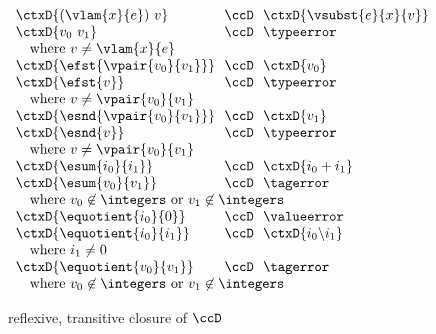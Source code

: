 \begin{flushleft}
\begin{minipage}[t]{\columnwidth}
\begin{mathpar}
\end{mathpar}
\end{minipage}

\begin{minipage}[b]{\columnwidth}
\\
$\begin{array}{l@{~~}c@{~~}l}
  \ctxD{(\vlam{x}{e})~v} & \ccD & \ctxD{\vsubst{e}{x}{v}}
\\
  \ctxD{v_0~v_1} & \ccD & \typeerror
\\ \multicolumn{3}{l}{\mbox{\quad where $v \neq \vlam{x}{e}$}}
\\
  \ctxD{\efst{\vpair{v_0}{v_1}}} & \ccD & \ctxD{v_0}
\\
  \ctxD{\efst{v}} & \ccD & \typeerror
\\ \multicolumn{3}{l}{\mbox{\quad where $v \neq \vpair{v_0}{v_1}$}}
\\
  \ctxD{\esnd{\vpair{v_0}{v_1}}} & \ccD & \ctxD{v_1}
\\
  \ctxD{\esnd{v}} & \ccD & \typeerror
\\ \multicolumn{3}{l}{\mbox{\quad where $v \neq \vpair{v_0}{v_1}$}}
\\
  \ctxD{\esum{i_0}{i_1}} & \ccD & \ctxD{i_0 + i_1}
\\
  \ctxD{\esum{v_0}{v_1}} & \ccD & \tagerror
\\ \multicolumn{3}{l}{\mbox{\quad where $v_0 \not\in \integers$ or $v_1 \not\in \integers$}}
\\
  \ctxD{\equotient{i_0}{0}} & \ccD & \valueerror
\\
  \ctxD{\equotient{i_0}{i_1}} & \ccD & \ctxD{i_0 \backslash i_1}
\\ \multicolumn{3}{l}{\mbox{\quad where $i_1 \neq 0$}}
\\
  \ctxD{\equotient{v_0}{v_1}} & \ccD & \tagerror
\\ \multicolumn{3}{l}{\mbox{\quad where $v_0 \not\in \integers$ or $v_1 \not\in \integers$}}
\end{array}$

\medskip
{} reflexive, transitive closure of $\ccD$


\end{minipage}
\end{flushleft}
